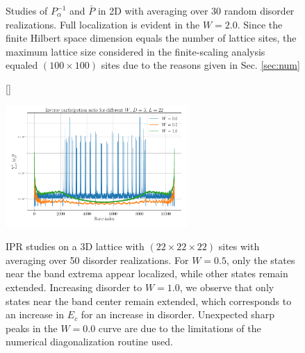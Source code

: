 \documentclass[10pt,a4paper]{article}
\begin{document}
\begin{figure}[H]
\caption{Studies of $P^{-1}_\alpha$ and $\bar{P}$ in 2D with averaging over 30 random disorder realizations. Full localization is evident in the $W=2.0$. Since the finite Hilbert space dimension equals the number of lattice sites, the maximum lattice size considered in the finite-scaling analysis equaled $(100\times100)$ sites due to the reasons given in Sec. \ref{sec:num}}
\label{fig:2D_ipr} 
\end{figure} 
\begin{figure}[H]
[\FBwidth]
{\caption{IPR studies on a 3D lattice with $(22\times22\times22)$ sites with averaging over 50 disorder realizations. For $W=0.5$, only the states near the band extrema appear localized, while other states remain extended. Increasing disorder to $W=1.0$, we observe that only states near the band center remain extended, which corresponds to an increase in $E_c$ for an increase in disorder. Unexpected sharp peaks in the $W=0.0$ curve are due to the limitations of the numerical diagonalization routine used.}\label{fig:3D_ipr}}
{\includegraphics[width=0.62\textwidth]{3D_Anderson_localization_Seminar_scaling_analysis_D3_shape_22_22_22_eigensys_plots_single.pdf}}
\end{figure}
\end{document}
